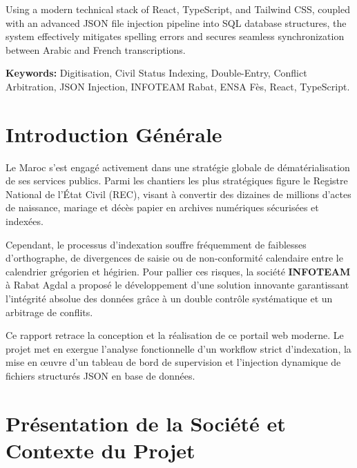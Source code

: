 \documentclass[12pt,a4paper,oneside]{report}
\begin{document}
Using a modern technical stack of React, TypeScript, and Tailwind CSS, coupled with an advanced JSON file injection pipeline into SQL database structures, the system effectively mitigates spelling errors and secures seamless synchronization between Arabic and French transcriptions.

\textbf{Keywords:} Digitisation, Civil Status Indexing, Double-Entry, Conflict Arbitration, JSON Injection, INFOTEAM Rabat, ENSA Fès, React, TypeScript.

\tableofcontents
\listoffigures
\newpage

\chapter*{Introduction Générale}
Le Maroc s'est engagé activement dans une stratégie globale de dématérialisation de ses services publics. Parmi les chantiers les plus stratégiques figure le Registre National de l'État Civil (REC), visant à convertir des dizaines de millions d'actes de naissance, mariage et décès papier en archives numériques sécurisées et indexées.

Cependant, le processus d'indexation souffre fréquemment de faiblesses d'orthographe, de divergences de saisie ou de non-conformité calendaire entre le calendrier grégorien et hégirien. Pour pallier ces risques, la société \textbf{INFOTEAM} à Rabat Agdal a proposé le développement d'une solution innovante garantissant l'intégrité absolue des données grâce à un double contrôle systématique et un arbitrage de conflits.

Ce rapport retrace la conception et la réalisation de ce portail web moderne. Le projet met en exergue l'analyse fonctionnelle d'un workflow strict d'indexation, la mise en œuvre d'un tableau de bord de supervision et l'injection dynamique de fichiers structurés JSON en base de données.

\chapter{Présentation de la Société et Contexte du Projet}
\end{document}
